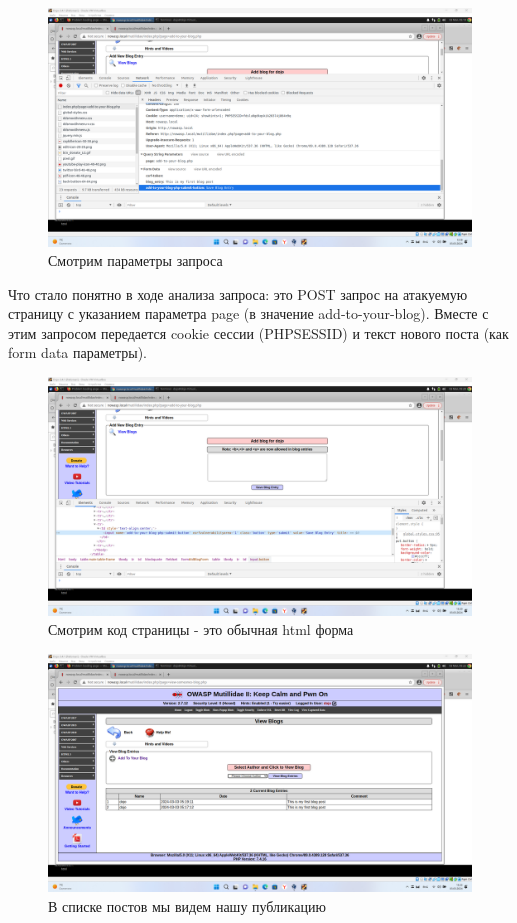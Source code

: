 \documentclass[a4paper]{article}
\begin{document}
  \begin{figure}[H]
    \centering
    \includegraphics[width=\textwidth]{Screenshot_31}
    \caption{Смотрим параметры запроса}
  \end{figure}

  Что стало понятно в ходе анализа запроса: это POST запрос на атакуемую страницу с указанием параметра page (в значение
  add-to-your-blog). Вместе с этим запросом передается cookie сессии (PHPSESSID) и текст нового поста (как form data параметры).

  \begin{figure}[H]
    \centering
    \includegraphics[width=\textwidth]{Screenshot_32}
    \caption{Смотрим код страницы - это обычная html форма}
  \end{figure}

  \begin{figure}[H]
    \centering
    \includegraphics[width=\textwidth]{Screenshot_33}
    \caption{В списке постов мы видем нашу публикацию}
  \end{figure}
\end{document}
